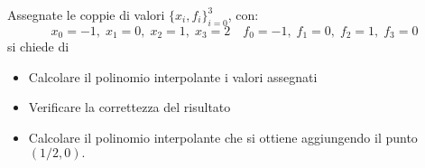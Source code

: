 Assegnate le coppie di valori $\{x_i,f_i \}_{i=0}^3$, con:
\[
x_0=-1, \; x_1=0, \; x_2=1, \; x_3=2 \quad f_0=-1, \; f_1=0, \;
f_2=1, \; f_3=0
\]
si chiede di
\begin {itemize}
\item Calcolare il polinomio interpolante i valori
assegnati
\item Verificare la correttezza del risultato
\item Calcolare il polinomio interpolante che si ottiene aggiungendo il punto  $(1/2,0).$
\end{itemize}
